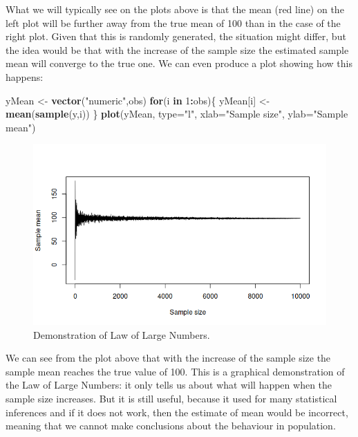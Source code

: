 \documentclass[
]{book}
\newenvironment{Shaded}{\begin{snugshade}}{\end{snugshade}}
\newcommand{\ControlFlowTok}[1]{\textcolor[rgb]{0.13,0.29,0.53}{\textbf{#1}}}
\newcommand{\DataTypeTok}[1]{\textcolor[rgb]{0.13,0.29,0.53}{#1}}
\newcommand{\DecValTok}[1]{\textcolor[rgb]{0.00,0.00,0.81}{#1}}
\newcommand{\KeywordTok}[1]{\textcolor[rgb]{0.13,0.29,0.53}{\textbf{#1}}}
\newcommand{\NormalTok}[1]{#1}
\newcommand{\OperatorTok}[1]{\textcolor[rgb]{0.81,0.36,0.00}{\textbf{#1}}}
\newcommand{\StringTok}[1]{\textcolor[rgb]{0.31,0.60,0.02}{#1}}
\theoremstyle{definition}
\theoremstyle{definition}
\theoremstyle{definition}
\theoremstyle{definition}
\theoremstyle{remark}
\begin{document}
What we will typically see on the plots above is that the mean (red line) on the left plot will be further away from the true mean of 100 than in the case of the right plot. Given that this is randomly generated, the situation might differ, but the idea would be that with the increase of the sample size the estimated sample mean will converge to the true one. We can even produce a plot showing how this happens:

\begin{Shaded}
\begin{Highlighting}[]
\NormalTok{yMean \textless{}{-}}\StringTok{ }\KeywordTok{vector}\NormalTok{(}\StringTok{"numeric"}\NormalTok{,obs)}
\ControlFlowTok{for}\NormalTok{(i }\ControlFlowTok{in} \DecValTok{1}\OperatorTok{:}\NormalTok{obs)\{}
\NormalTok{    yMean[i] \textless{}{-}}\StringTok{ }\KeywordTok{mean}\NormalTok{(}\KeywordTok{sample}\NormalTok{(y,i))}
\NormalTok{\}}
\KeywordTok{plot}\NormalTok{(yMean, }\DataTypeTok{type=}\StringTok{"l"}\NormalTok{, }\DataTypeTok{xlab=}\StringTok{"Sample size"}\NormalTok{, }\DataTypeTok{ylab=}\StringTok{"Sample mean"}\NormalTok{)}
\end{Highlighting}
\end{Shaded}

\begin{figure}
\centering
\includegraphics{images/02-statistics-LLN.png}
\caption{\label{fig:statsSampleMean}Demonstration of Law of Large Numbers.}
\end{figure}

We can see from the plot above that with the increase of the sample size the sample mean reaches the true value of 100. This is a graphical demonstration of the Law of Large Numbers: it only tells us about what will happen when the sample size increases. But it is still useful, because it used for many statistical inferences and if it does not work, then the estimate of mean would be incorrect, meaning that we cannot make conclusions about the behaviour in population.
\end{document}
